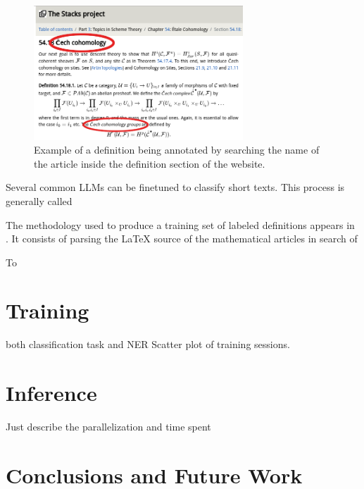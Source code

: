 \documentclass{article}
\begin{document}
\begin{figure}\label{stacks}
    \centering
    \includegraphics[width=0.7\textwidth]{Images/stacks_defs.png}
    \caption{Example of a definition being annotated by searching the name of the article inside the definition section of the website.}
\end{figure}

Several common LLMs can be finetuned to classify short texts. This process is generally called 

The methodology used to produce a training set of labeled definitions appears in \cite{Deyan1, glossary}. It consists of parsing the \LaTeX{} source of the mathematical articles in search of 

To 


\section{Training}
both classification task and NER
Scatter plot of training sessions.

\section{Inference}
Just describe the parallelization and time spent

\section{Conclusions and Future Work}



\end{document}
